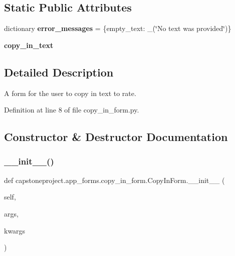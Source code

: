 \subsection*{Static Public Attributes}
\begin{DoxyCompactItemize}
\item 
\mbox{\label{classcapstoneproject_1_1app__forms_1_1copy__in__form_1_1_copy_in_form_aaba4bf4f6c4af14a2d627601bec95805}} 
dictionary {\bfseries error\+\_\+messages} = \{\textquotesingle{}empty\+\_\+text\textquotesingle{}\+: \+\_\+(\char`\"{}No text was provided\char`\"{})\}
\item 
{\bfseries copy\+\_\+in\+\_\+text}
\end{DoxyCompactItemize}


\subsection{Detailed Description}
\begin{DoxyVerb}    A form for the user to copy in text to rate.
\end{DoxyVerb}
 

Definition at line 8 of file copy\+\_\+in\+\_\+form.\+py.



\subsection{Constructor \& Destructor Documentation}
\mbox{\label{classcapstoneproject_1_1app__forms_1_1copy__in__form_1_1_copy_in_form_a4c1bc324d54f002d42acbdee9aeee8c9}} 
\subsubsection{\texorpdfstring{\+\_\+\+\_\+init\+\_\+\+\_\+()}{\_\_init\_\_()}}
{\footnotesize\ttfamily def capstoneproject.\+app\+\_\+forms.\+copy\+\_\+in\+\_\+form.\+Copy\+In\+Form.\+\_\+\+\_\+init\+\_\+\+\_\+ (\begin{DoxyParamCaption}\item[{}]{self,  }\item[{}]{args,  }\item[{}]{kwargs }\end{DoxyParamCaption})}

